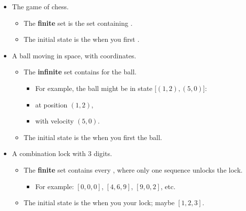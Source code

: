         \begin{itemize}
            \item The game of chess.
                \begin{itemize}
                    \item The \textbf{finite} set  is the set containing .
                    \item The initial state  is the  when you first .
                \end{itemize}
                
            \item A ball moving in space, with coordinates.
                \begin{itemize}
                    \item The \textbf{infinite} set  contains 
                    for the ball.
                        \begin{itemize}
                            \item For example, the ball might be in state $\Big[ (1,2), (5,0)\Big]$:
                            \item at position $(1,2)$, 
                            \item with velocity $(5,0)$.
                            
                        \end{itemize}
                    \item The initial state  is the  when you first  the ball.
                \end{itemize}
                
            \item A combination lock with 3 digits.
                \begin{itemize}
                    \item The \textbf{finite} set  contains every , where only one sequence unlocks the lock.
                        \begin{itemize}
                            \item For example: $[0,0,0]$, \; $[4,6,9]$, \; $[9, 0, 2]$, \; etc.
                        \end{itemize}
                    \item The initial state  is the  when you  your lock; maybe $[1,2,3]$.
                \end{itemize}
        \end{itemize}




